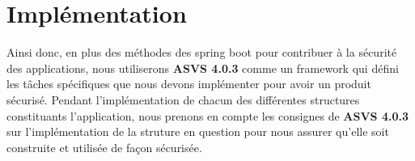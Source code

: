 	\section{Impl\'ementation}
		Ainsi donc, en plus des m\'ethodes des spring boot pour contribuer \`a la s\'ecurit\'e des applications, nous utiliserons \textbf{ASVS 4.0.3} comme un framework qui d\'efini les t\^aches sp\'ecifiques que nous devons impl\'ementer pour avoir un produit s\'ecuris\'e. Pendant l'impl\'ementation de chacun des diff\'erentes structures constituants l'application, nous prenons en compte les consignes de \textbf{ASVS 4.0.3} sur l'impl\'ementation de la  struture en question pour nous assurer qu'elle soit construite et utilis\'ee de fa\c{c}on s\'ecuris\'ee.


%
%
%
%
